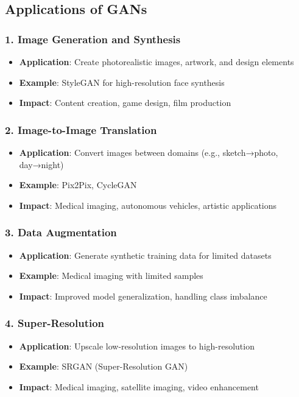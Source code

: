 \documentclass[12pt,a4paper]{article}
\begin{document}
\subsection{Applications of GANs}

\subsubsection{1. Image Generation and Synthesis}
\begin{itemize}
    \item \textbf{Application}: Create photorealistic images, artwork, and design elements
    \item \textbf{Example}: StyleGAN for high-resolution face synthesis
    \item \textbf{Impact}: Content creation, game design, film production
\end{itemize}

\subsubsection{2. Image-to-Image Translation}
\begin{itemize}
    \item \textbf{Application}: Convert images between domains (e.g., sketch→photo, day→night)
    \item \textbf{Example}: Pix2Pix, CycleGAN
    \item \textbf{Impact}: Medical imaging, autonomous vehicles, artistic applications
\end{itemize}

\subsubsection{3. Data Augmentation}
\begin{itemize}
    \item \textbf{Application}: Generate synthetic training data for limited datasets
    \item \textbf{Example}: Medical imaging with limited samples
    \item \textbf{Impact}: Improved model generalization, handling class imbalance
\end{itemize}

\subsubsection{4. Super-Resolution}
\begin{itemize}
    \item \textbf{Application}: Upscale low-resolution images to high-resolution
    \item \textbf{Example}: SRGAN (Super-Resolution GAN)
    \item \textbf{Impact}: Medical imaging, satellite imaging, video enhancement
\end{itemize}
\end{document}

